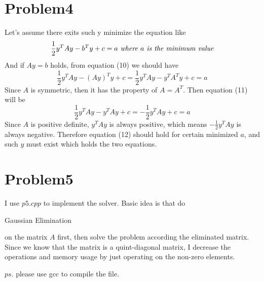 \documentclass[11pt]{article}
\begin{document}
	\section{Problem4}
	\par Let's assume there exits such y minimize the equation like
	\begin{equation}
		\frac{1}{2}y^TAy - b^Ty + c = a \mbox{\begin{itshape} where $a$ is the minimum value\end{itshape}}
	\end{equation}
	And if $Ay = b$ holds, from equation (10) we should have
	\begin{equation}
		\frac{1}{2}y^TAy - (Ay)^Ty + c = \frac{1}{2}y^TAy - y^TA^Ty + c = a
	\end{equation}
	Since $A$ is symmetric, then it has the property of $A = A^T$. Then equation (11) will be
	\begin{equation}
		\frac{1}{2}y^TAy - y^TAy + c = {-\frac{1}{2}}y^TAy + c = a
	\end{equation}
	Since $A$ is positive definite, $y^TAy$ is always positive, which means ${-\frac{1}{2}}y^TAy$ is always negative. Therefore equation (12) should hold for certain minimized $a$, and such $y$ must exist which holds the two equations.
	\section{Problem5}
	\setlength{\parindent}{2em}
	\par I use $p5.cpp$ to implement the solver. Basic idea is that do \begin{itshape}Gaussian Elimination\end{itshape} on the matrix $A$ first, then solve the problem according the eliminated matrix. Since we know that the matrix is a quint-diagonal matrix, I decrease the operations and memory usage by just operating on the non-zero elements.
	\par $ps.$ please use gcc to compile the file.
\end{document}
